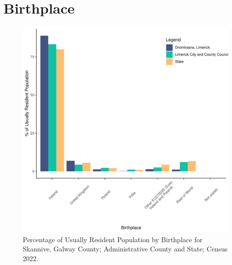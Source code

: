 \documentclass{article}
\begin{document}
\section{Birthplace}\label{sect:Birth}
\begin{figure}[H]
	\centering
	\includegraphics[width = 130mm]{../figures/BirthED.pdf}
	\caption{Percentage of Usually Resident Population by Birthplace for Skannive, Galway County; Administrative County and State; Census 2022.}
	\label{fig:vbnv}
	\end{figure}
	
\end{document}
